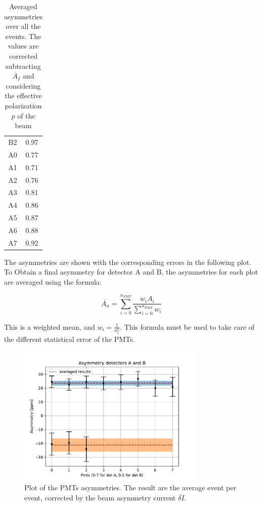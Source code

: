 \begin{table}[ht]
{\begin{tabular}{c|c}
 B2    & 0.97 \\
 A0    & 0.77 \\
 A1    & 0.71 \\
 A2    & 0.76 \\
 A3    & 0.81 \\
 A4    & 0.86 \\
 A5    & 0.87 \\
 A6    & 0.88 \\
 A7    & 0.92 \\
\hline
\end{tabular}}
\caption{Averaged asymmetries over all the events. The values are corrected subtracting $\overline{A}_{I}$ and considering the effective polarization $p$ of the beam}
\end{table}

The asymmetries are shown with the corresponding errors in the following plot.
To Obtain a final asymmetry for detector A and B, the asymmetries for each plot are averaged using the formula:

\begin{equation}
\overline{A_{n}} = \sum_{i = 0}^{n_{PMT}} \dfrac{ w_{i} A_{i}}{\sum_{i = 0}^{n_{PMT}} w_{i}}
\end{equation}

This is a weighted mean, and $w_{i} = \frac{1}{\sigma^{2}_{i}}$. This formula must be used to take care of the different statistical error of the PMTs.

\begin{figure}[hbtp]
\centering
\includegraphics[width = 0.80\textwidth]{Analysis/Dataselection/FirstResult.pdf}
\caption{Plot of the PMTs asymmetries. The result are the average event per event, corrected by the beam asymmetry current 
$\overline{\delta I}$. }
\end{figure}

